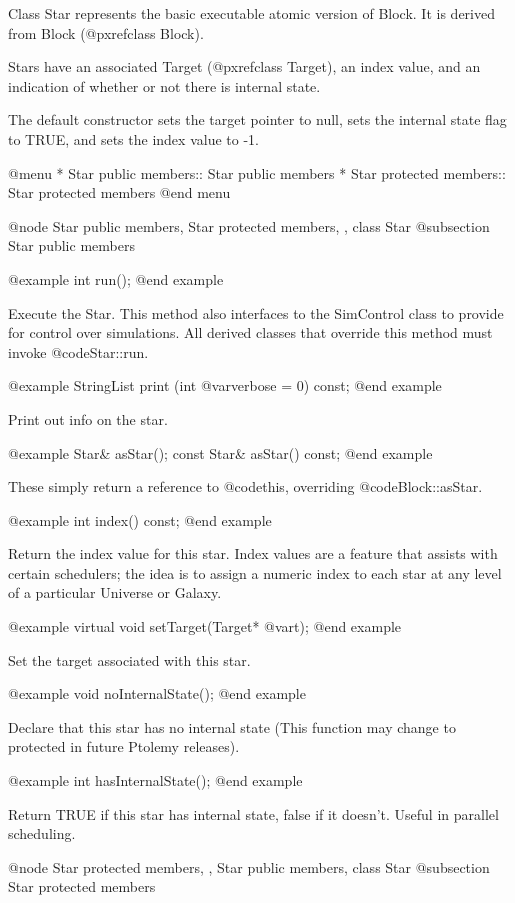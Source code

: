 Class Star represents the basic executable atomic version of Block.
It is derived from Block (@pxref{class Block}).

Stars have an associated Target (@pxref{class Target}), an index value,
and an indication of whether or not there is internal state.

The default constructor sets the target pointer to null, sets the internal
state flag to TRUE, and sets the index value to -1.

@menu
* Star public members::  Star public members
* Star protected members::  Star protected members
@end menu

@node Star public members, Star protected members,  , class Star
@subsection Star public members

@example
int run();
@end example

Execute the Star.  This method also interfaces to the SimControl
class to provide for control over simulations.  All derived classes
that override this method must invoke @code{Star::run}.

@example
StringList print (int @var{verbose} = 0) const;
@end example

Print out info on the star.

@example
Star& asStar();
const Star& asStar() const;
@end example

These simply return a reference to @code{this}, overriding @code{Block::asStar}.

@example
int index() const;
@end example

Return the index value for this star.  Index values are a feature
that assists with certain schedulers; the idea is to assign a numeric
index to each star at any level of a particular Universe or Galaxy.

@example
virtual void setTarget(Target* @var{t});
@end example

Set the target associated with this star.

@example
void noInternalState();
@end example

Declare that this star has no internal state (This function may
change to protected in future Ptolemy releases).

@example
int hasInternalState();
@end example

Return TRUE if this star has internal state, false if it doesn't.
Useful in parallel scheduling.

@node Star protected members,  , Star public members, class Star
@subsection Star protected members

